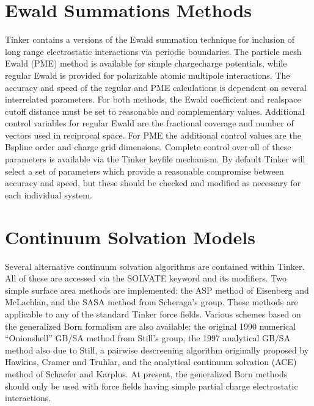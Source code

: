 \documentclass[letterpaper,11pt,english]{sphinxmanual}
\begin{document}
\section{Ewald Summations Methods}
\label{\detokenize{text/special-features:ewald-summations-methods}}
\sphinxAtStartPar
Tinker contains a versions of the Ewald summation technique for inclusion of long range electrostatic interactions via periodic boundaries. The particle mesh Ewald (PME) method is available for simple charge\sphinxhyphen{}charge potentials, while regular Ewald is provided for polarizable atomic multipole interactions. The accuracy and speed of the regular and PME calculations is dependent on several interrelated parameters. For both methods, the Ewald coefficient and real\sphinxhyphen{}space cutoff distance must be set to reasonable and complementary values. Additional control variables for regular Ewald are the fractional coverage and number of vectors used in reciprocal space. For PME the additional control values are the B\sphinxhyphen{}spline order and charge grid dimensions. Complete control over all of these parameters is available via the Tinker keyfile mechanism. By default Tinker will select a set of parameters which provide a reasonable compromise between accuracy and speed, but these should be checked and modified as necessary for each individual system.


\section{Continuum Solvation Models}
\label{\detokenize{text/special-features:continuum-solvation-models}}
\sphinxAtStartPar
Several alternative continuum solvation algorithms are contained within Tinker. All of these are accessed via the SOLVATE keyword and its modifiers. Two simple surface area methods are implemented: the ASP method of Eisenberg and McLachlan, and the SASA method from Scheraga’s group. These methods are applicable to any of the standard Tinker force fields. Various schemes based on the generalized Born formalism are also available: the original 1990 numerical “Onion\sphinxhyphen{}shell” GB/SA method from Still’s group, the 1997 analytical GB/SA method also due to Still, a pairwise descreening algorithm originally proposed by Hawkins, Cramer and Truhlar, and the analytical continuum solvation (ACE) method of Schaefer and Karplus. At present, the generalized Born methods should only be used with force fields having simple partial charge electrostatic interactions.
\end{document}
